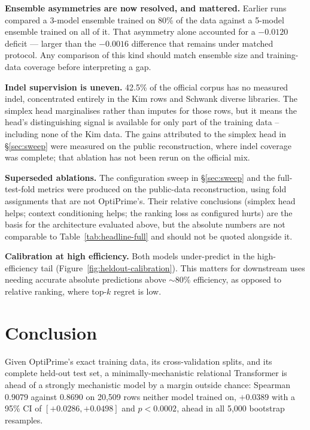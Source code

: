 \documentclass[11pt]{article}
\begin{document}
\textbf{Ensemble asymmetries are now resolved, and mattered.} Earlier runs compared
a 3-model ensemble trained on 80\% of the data against a 5-model ensemble trained on
all of it. That asymmetry alone accounted for a $-0.0120$ deficit --- larger than the
$-0.0016$ difference that remains under matched protocol. Any comparison of this kind
should match ensemble size and training-data coverage before interpreting a gap.

\textbf{Indel supervision is uneven.} 42.5\% of the official corpus has no measured
indel, concentrated entirely in the Kim rows and Schwank diverse libraries. The
simplex head marginalises rather than imputes for those rows, but it means the
head's distinguishing signal is available for only part of the training data --
including none of the Kim data. The gains attributed to the simplex head in
\S\ref{sec:sweep} were measured on the public reconstruction, where indel coverage
was complete; that ablation has not been rerun on the official mix.

\textbf{Superseded ablations.} The configuration sweep in \S\ref{sec:sweep} and the
full-test-fold metrics were produced on the public-data reconstruction, using fold
assignments that are not OptiPrime's. Their relative conclusions (simplex head helps;
context conditioning helps; the ranking loss as configured hurts) are the basis for
the architecture evaluated above, but the absolute numbers are not comparable to
Table~\ref{tab:headline-full} and should not be quoted alongside it.

\textbf{Calibration at high efficiency.} Both models under-predict in the
high-efficiency tail (Figure~\ref{fig:heldout-calibration}). This matters for
downstream uses needing accurate absolute predictions above $\sim$80\% efficiency,
as opposed to relative ranking, where top-$k$ regret is low.

\section{Conclusion}

Given OptiPrime's exact training data, its cross-validation splits, and its
complete held-out test set, a minimally-mechanistic relational Transformer is
ahead of a strongly mechanistic model by a margin outside chance: Spearman
$0.9079$ against $0.8690$ on 20{,}509 rows neither model trained on, $+0.0389$
with a 95\% CI of $[+0.0286, +0.0498]$ and $p<0.0002$, ahead in all 5{,}000
bootstrap resamples.
\end{document}
